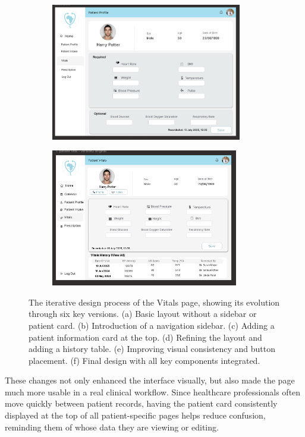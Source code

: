 \begin{figure}[H]\ContinuedFloat %
  \centering
  \begin{subfigure}[t]{0.48\linewidth}
    \centering
    \includegraphics[height=6cm]{images03/3-2-2-figure4e.png}
    \captionsetup{justification=centering}
    \caption{}
    \label{fig:vitals-v5}
  \end{subfigure}\hfill
  \begin{subfigure}[t]{0.48\linewidth}
    \centering
    \includegraphics[height=6cm]{images03/3-2-2-figure4f.png}
    \captionsetup{justification=centering}
    \caption{}
    \label{fig:vitals-v6}
  \end{subfigure}
  \caption{The iterative design process of the Vitals page, showing its evolution through six key versions. (a) Basic layout without a sidebar or patient card. (b) Introduction of a navigation sidebar. (c) Adding a patient information card at the top. (d) Refining the layout and adding a history table. (e) Improving visual consistency and button placement. (f) Final design with all key components integrated.}
  \label{fig:vitals-evolution}
\end{figure}

These changes not only enhanced the interface visually, but also made the page much more usable in a real clinical workflow. Since healthcare professionals often move quickly between patient records, having the patient card consistently displayed at the top of all patient-specific pages helps reduce confusion, reminding them of whose data they are viewing or editing.

